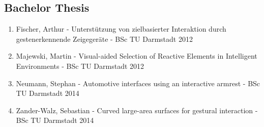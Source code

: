 \begin{appendix}
\section{Bachelor Thesis}

\begin{enumerate}
\item Fischer, Arthur - Unterstützung von zielbasierter Interaktion durch gestenerkennende Zeigegeräte - BSc TU Darmstadt 2012
\item Majewski, Martin - Visual-aided Selection of Reactive Elements in Intelligent Environments - BSc TU Darmstadt 2012
\item Neumann, Stephan - Automotive interfaces using an interactive armrest - BSc TU Darmstadt 2014
\item Zander-Walz, Sebastian - Curved large-area surfaces for gestural interaction - BSc TU Darmstadt 2014
\end{enumerate}

 

\end{appendix}




